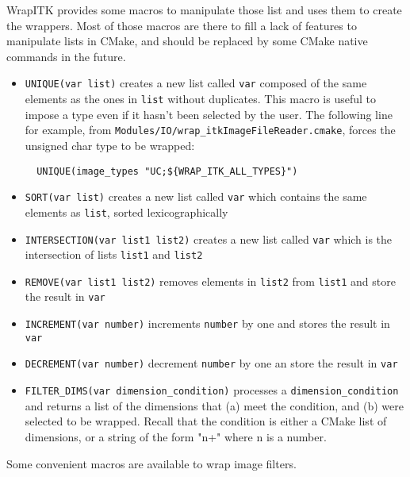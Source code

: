 \documentclass{InsightArticle}
\begin{document}
WrapITK provides some macros to manipulate those list and uses them
to create the wrappers. Most of those macros are there to fill a lack
of features to manipulate lists in CMake, and should be replaced by
some CMake native commands in the future.

\begin{itemize}
  \item \verb$UNIQUE(var list)$ creates a new list called \verb$var$ composed of the same
elements as the ones in \verb$list$ without duplicates. This macro is useful to impose
a type even if it hasn't been selected by the user. The following line for example, from
\verb$Modules/IO/wrap_itkImageFileReader.cmake$, forces the unsigned char type to be
wrapped:

\small \begin{verbatim}
  UNIQUE(image_types "UC;${WRAP_ITK_ALL_TYPES}")
\end{verbatim} \normalsize

  \item \verb$SORT(var list)$ creates a new list called \verb$var$ which contains the
same elements as \verb$list$, sorted lexicographically

  \item \verb$INTERSECTION(var list1 list2)$ creates a new list called \verb$var$ which
is the intersection of lists \verb$list1$ and \verb$list2$

  \item \verb$REMOVE(var list1 list2)$ removes elements in \verb$list2$ from \verb$list1$
and store the result in \verb$var$

  \item \verb$INCREMENT(var number)$ increments \verb$number$ by one and stores the result
in \verb$var$

  \item \verb$DECREMENT(var number)$ decrement \verb$number$ by one an store the result
in \verb$var$

  \item \verb$FILTER_DIMS(var dimension_condition)$ processes a \verb$dimension_condition$
and returns a list of the dimensions that (a) meet the condition, and (b) were selected
to be wrapped. Recall that the condition is either a CMake list of dimensions, or a
string of the form "n+" where n is a number.

\end{itemize}


Some convenient macros are available to wrap image filters.
\end{document}
